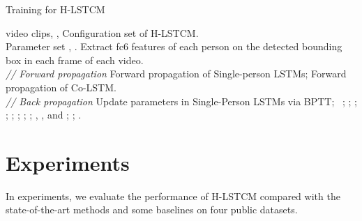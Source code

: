 \documentclass[9pt,journal,letterpaper,twocolumn]{IEEEtran}
\begin{document}
	\begin{algorithm}[t]
		\scriptsize{
			\renewcommand{\algorithmicrequire}{\textbf{Input:}}
			\renewcommand\algorithmicensure {\textbf{Output:} }
			\caption{Training for H-LSTCM}
			\small
			\label{alg1} 
			\begin{algorithmic}[1]
				\REQUIRE  
				{  video clips}, , Configuration set of H-LSTCM.\\
				\renewcommand{\algorithmicrequire}{\textbf{Initialization:}} 
				\REQUIRE 
				Parameter set , 
				.
				\STATE Extract fc6 features of each person on the detected bounding box in each frame of each video.\\
				{\em // Forward propagation}
				\STATE Forward propagation of Single-person LSTMs;
				\STATE Forward propagation of Co-LSTM. \\
				{\em // Back propagation}
				\FOR{}
				\FOR{}
				\STATE Update parameters in Single-Person LSTMs via BPTT;
				\STATE ~\footnotemark[1];
				\STATE ;
				\STATE ;
				\STATE ;
				\STATE ;
								\STATE ;
				\STATE ;
				\STATE ;
				\STATE , , and ;
				\STATE ;
				\STATE .		
				\ENDFOR	
				\ENDFOR		
			\end{algorithmic}
		}
	\end{algorithm}	
	
	
	


	\section{Experiments}
	\label{EXP}
	In experiments, we evaluate the performance of H-LSTCM compared with the state-of-the-art methods and some baselines on four public datasets. 
\end{document}

